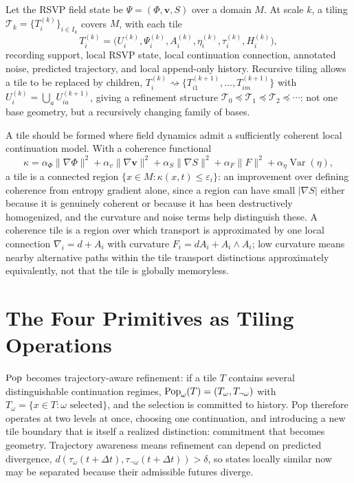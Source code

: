 Let the RSVP field state be $\Psi = (\Phi, \mathbf{v}, S)$ over a domain $M$. At scale $k$, a tiling $\mathcal{T}_k = \{T_i^{(k)}\}_{i \in I_k}$ covers $M$, with each tile
\[
T_i^{(k)} = \bigl(U_i^{(k)}, \Psi_i^{(k)}, A_i^{(k)}, \eta_i^{(k)}, \tau_i^{(k)}, H_i^{(k)}\bigr),
\]
recording support, local RSVP state, local continuation connection, annotated noise, predicted trajectory, and local append-only history. Recursive tiling allows a tile to be replaced by children, $T_i^{(k)} \rightsquigarrow \{T_{i1}^{(k+1)}, \ldots, T_{im}^{(k+1)}\}$ with $U_i^{(k)} = \bigcup_a U_{ia}^{(k+1)}$, giving a refinement structure $\mathcal{T}_0 \preceq \mathcal{T}_1 \preceq \mathcal{T}_2 \preceq \cdots$: not one base geometry, but a recursively changing family of bases.

A tile should be formed where field dynamics admit a sufficiently coherent local continuation model. With a coherence functional
\[
\kappa = \alpha_\Phi \|\nabla \Phi\|^2 + \alpha_v \|\nabla \mathbf{v}\|^2 + \alpha_S \|\nabla S\|^2 + \alpha_F \|F\|^2 + \alpha_\eta \operatorname{Var}(\eta),
\]
a tile is a connected region $\{x \in M : \kappa(x,t) \leq \varepsilon_i\}$: an improvement over defining coherence from entropy gradient alone, since a region can have small $|\nabla S|$ either because it is genuinely coherent or because it has been destructively homogenized, and the curvature and noise terms help distinguish these. A coherence tile is a region over which transport is approximated by one local connection $\nabla_i = d + A_i$ with curvature $F_i = dA_i + A_i \wedge A_i$; low curvature means nearby alternative paths within the tile transport distinctions approximately equivalently, not that the tile is globally memoryless.

\section{The Four Primitives as Tiling Operations}

$\mathrm{Pop}$ becomes trajectory-aware refinement: if a tile $T$ contains several distinguishable continuation regimes, $\mathrm{Pop}_\omega(T) = (T_\omega, T_{\neg\omega})$ with $T_\omega = \{x \in T : \omega \text{ selected}\}$, and the selection is committed to history. Pop therefore operates at two levels at once, choosing one continuation, and introducing a new tile boundary that is itself a realized distinction: commitment that becomes geometry. Trajectory awareness means refinement can depend on predicted divergence, $d(\tau_\omega(t+\Delta t), \tau_{\neg\omega}(t+\Delta t)) > \delta$, so states locally similar now may be separated because their admissible futures diverge.

